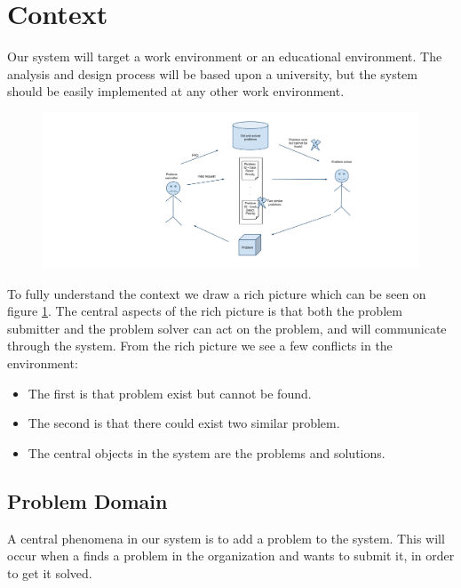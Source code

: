 \section{Context}
Our system will target a work environment or an educational environment.
The analysis and design process will be based upon a university, but the system should be easily implemented at any other work environment. 

\begin{figure}[H]%
\includegraphics[scale = 0.45]{input/background/rich_picture.pdf}%
%
\label{fig:rich_picture}%
\end{figure}

To fully understand the context we draw a rich picture which can be seen on figure \ref{fig:rich_picture}. 
The central aspects of the rich picture is that both the problem submitter and the problem solver can act on the problem, and will communicate through the system. 
From the rich picture we see a few conflicts in the environment:
\begin{itemize}
		\item The first is that problem exist but cannot be found.
		\item The second is that there could exist two similar problem.
		\item The central objects in the system are the problems and solutions.
\end{itemize} 

\subsection{Problem Domain}
A central phenomena in our system is to add a problem to the system.
This will occur when a \aclient[] finds a problem in the organization and wants to submit it, in order to get it solved.

